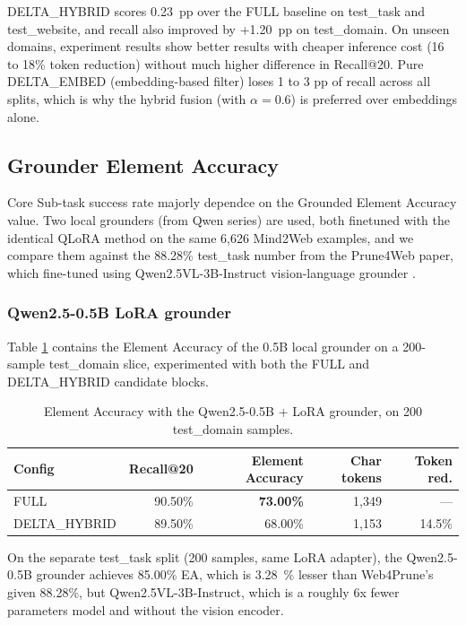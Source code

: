 DELTA\_HYBRID scores 0.23~pp over the FULL baseline on test\_task and test\_website, and recall also improved by +1.20~pp on test\_domain. On unseen domains, experiment results show better results with cheaper inference cost (16 to 18\% token reduction) without much higher difference in Recall@20. Pure DELTA\_EMBED (embedding-based filter) loses 1 to 3 pp of recall across all splits, which is why the hybrid fusion (with $\alpha = 0.6$) is preferred over embeddings alone.


\subsection{Grounder Element Accuracy}

Core Sub-task success rate majorly dependce on the Grounded Element Accuracy value. Two local grounders (from Qwen series) are used, both finetuned with the identical QLoRA method on the same 6,626 Mind2Web examples, and we compare them against the 88.28\% test\_task number from the Prune4Web paper, which fine-tuned using Qwen2.5VL-3B-Instruct vision-language grounder \cite{zhang2025prune4web}.

\subsubsection{Qwen2.5-0.5B LoRA grounder}

Table \ref{tab:ea_qwen25} contains the Element Accuracy of the 0.5B local grounder on a 200-sample test\_domain slice, experimented with both the FULL and DELTA\_HYBRID candidate blocks.

\begin{table}[!t]
\centering
\small
\begin{tabular}{l|r|r|r|r}
\hline
\textbf{Config} & \textbf{Recall@20} & \textbf{Element Accuracy} & \textbf{Char tokens} & \textbf{Token red.} \\
\hline
FULL & 90.50\% & \textbf{73.00\%} & 1{,}349 & --- \\
DELTA\_HYBRID & 89.50\% & 68.00\% & 1{,}153 & 14.5\% \\
\hline
\end{tabular}
\caption{Element Accuracy with the Qwen2.5-0.5B + LoRA grounder, on 200 test\_domain samples.}
\label{tab:ea_qwen25}
\end{table}

On the separate test\_task split (200 samples, same LoRA adapter), the Qwen2.5-0.5B grounder achieves 85.00\% EA, which is 3.28~\% lesser than Web4Prune's given 88.28\%, but Qwen2.5VL-3B-Instruct, which is a roughly 6x fewer parameters model and without the vision encoder.

